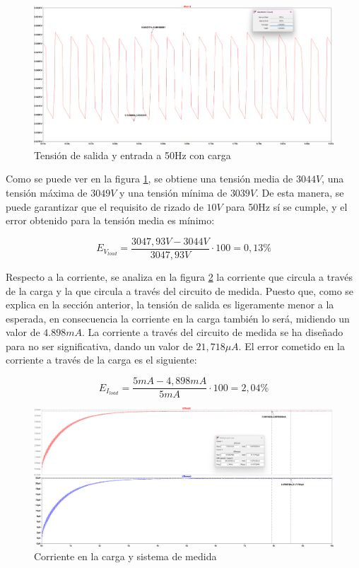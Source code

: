 \begin{figure}[H]
    \centering
    \includegraphics[width=1\textwidth]{Imagenes_alvaro/Vout_50hz_load.png}
    \caption{Tensión de salida y entrada a 50Hz con carga}
    \label{Vout_50hz_load}
\end{figure}

Como se puede ver en la figura \ref{Vout_50hz_load}, se obtiene una tensión media de $3044V$, una tensión máxima de $3049V$ y una tensión
mínima de $3039V$. De esta manera, se puede garantizar que el requisito de rizado de $10V$ para 50Hz sí se cumple, y el error obtenido 
para la tensión media es mínimo:

\begin{equation}
    E_{V_{load}} = \frac{3047,93V - 3044V}{3047,93V} \cdot 100 = 0,13\%
\end{equation}

Respecto a la corriente, se analiza en la figura \ref{Corrientes} la corriente que circula a través de la carga y la que circula a través del circuito
de medida. Puesto que, como se explica en la sección anterior, la tensión de salida es ligeramente menor a la esperada, en consecuencia la corriente en la carga también lo será,
midiendo un valor de $4.898mA$. La corriente a través del circuito de medida se ha diseñado para no ser significativa, dando un valor de $21,718\mu A$.
El error cometido en la corriente a través de la carga es el siguiente:

\begin{equation}
    E_{I_{load}} = \frac{5mA - 4,898mA}{5mA} \cdot 100 = 2,04\%
\end{equation}

\begin{figure}[H]
    \centering
    \includegraphics[width=1\textwidth]{Imagenes_alvaro/Corrientes.png}
    \caption{Corriente en la carga y sistema de medida}
    \label{Corrientes}
\end{figure}

